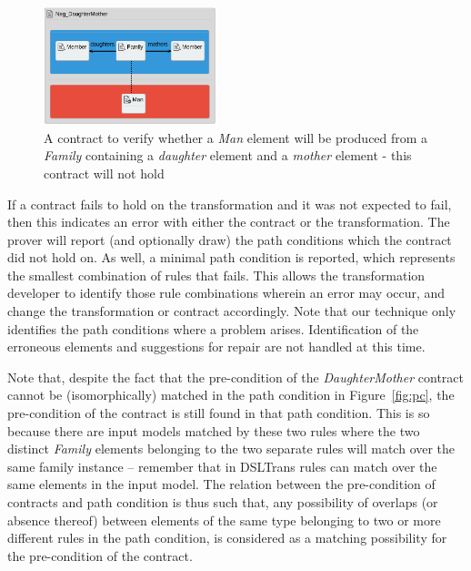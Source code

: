   \begin{figure}[t]
    \begin{center}
      \includegraphics[width=0.45\textwidth]{figures/FamToPersons/Neg_DaughterMother}
      \caption{A contract to verify whether a \emph{Man} element will be produced from a \emph{Family} containing a \emph{daughter} element and a \emph{mother} element - this contract will not hold}
      \label{fig:daughterMother}
    \end{center}
    \vspace{-0.20in}
  \end{figure}

If a contract fails to hold on the transformation and it was not expected to fail, then this indicates an error with either the contract or the transformation. The prover will report (and optionally draw) the path conditions which the contract did not hold on. As well, a minimal path condition is reported, which represents the smallest combination of rules that fails. This allows the transformation developer to identify those rule combinations wherein an error may occur, and change the transformation or contract accordingly. Note that our technique only identifies the path conditions where a problem arises. Identification of the erroneous elements and suggestions for repair are not handled at this time.

Note that, despite the fact that the pre-condition of the
\textit{Daughter\-Mother} contract cannot be (isomorphically) matched in the path
condition in Figure~\ref{fig:pc}, the pre-condition of the contract is still
found in that path condition. This is so because there are input models
matched by these two rules where the two distinct \textit{Family} elements
belonging to the two separate rules will match over the same family instance --
remember that in DSLTrans rules can match over the same elements in the input
model. The relation between the pre-condition of contracts and path condition is
thus such that, any possibility of overlaps (or absence thereof) between
elements of the same type belonging to two or more different rules in the path condition,
is considered as a matching possibility for the pre-condition of the
contract.

